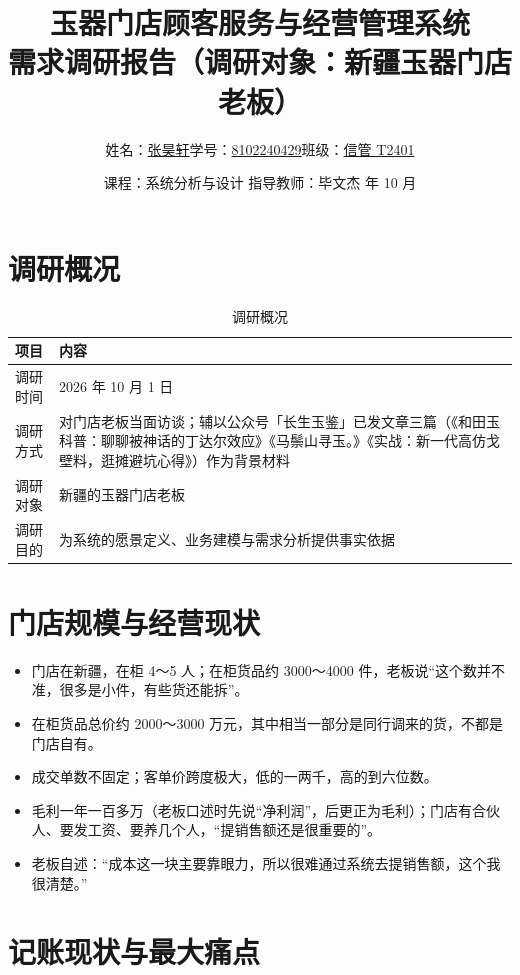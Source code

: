 \documentclass[12pt, a4paper]{ctexart}
\title{玉器门店顾客服务与经营管理系统\\[6pt] \large 需求调研报告（调研对象：新疆玉器门店老板）}
\author{姓名：\underline{张昊轩}\quad 学号：\underline{8102240429}\quad 班级：\underline{信管 T2401}}
\date{课程：系统分析与设计 \quad 指导教师：毕文杰 \quad 2026 年 10 月}
\begin{document}
\maketitle
\thispagestyle{empty}

\section{调研概况}

\begin{table}[H]
\centering
\caption{调研概况}
\begin{tabularx}{\textwidth}{@{}p{2.8cm} X@{}}
\toprule
项目 & 内容 \\
\midrule
调研时间 & 2026 年 10 月 1 日 \\
调研方式 & 对门店老板当面访谈；辅以公众号「长生玉鉴」已发文章三篇（《和田玉科普：聊聊被神话的丁达尔效应》《马鬃山寻玉。》《实战：新一代高仿戈壁料，逛摊避坑心得》）作为背景材料 \\
调研对象 & 新疆的玉器门店老板 \\
调研目的 & 为系统的愿景定义、业务建模与需求分析提供事实依据 \\
\bottomrule
\end{tabularx}
\end{table}

\section{门店规模与经营现状}

\begin{itemize}[leftmargin=1.6em, itemsep=2pt]
  \item 门店在新疆，在柜 4～5 人；在柜货品约 3000～4000 件，老板说“这个数并不准，很多是小件，有些货还能拆”。
  \item 在柜货品总价约 2000～3000 万元，其中相当一部分是同行调来的货，不都是门店自有。
  \item 成交单数不固定；客单价跨度极大，低的一两千，高的到六位数。
  \item 毛利一年一百多万（老板口述时先说“净利润”，后更正为毛利）；门店有合伙人、要发工资、要养几个人，“提销售额还是很重要的”。
  \item 老板自述：“成本这一块主要靠眼力，所以很难通过系统去提销售额，这个我很清楚。”
\end{itemize}

\section{记账现状与最大痛点}
\end{document}
